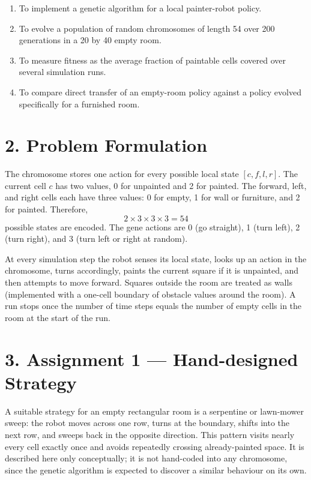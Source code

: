 \documentclass[12pt,a4paper]{article}
\begin{document}
\begin{enumerate}[leftmargin=1.6em]
  \item To implement a genetic algorithm for a local painter-robot policy.
  \item To evolve a population of random chromosomes of length 54 over 200 generations in a 20 by 40 empty room.
  \item To measure fitness as the average fraction of paintable cells covered over several simulation runs.
  \item To compare direct transfer of an empty-room policy against a policy evolved specifically for a furnished room.
\end{enumerate}

\section*{2. Problem Formulation}

The chromosome stores one action for every possible local state $[c,f,l,r]$. The current cell $c$ has two values, 0 for unpainted and 2 for painted. The forward, left, and right cells each have three values: 0 for empty, 1 for wall or furniture, and 2 for painted. Therefore,
\[
  2 \times 3 \times 3 \times 3 = 54
\]
possible states are encoded. The gene actions are 0 (go straight), 1 (turn left), 2 (turn right), and 3 (turn left or right at random).

At every simulation step the robot senses its local state, looks up an action in the chromosome, turns accordingly, paints the current square if it is unpainted, and then attempts to move forward. Squares outside the room are treated as walls (implemented with a one-cell boundary of obstacle values around the room). A run stops once the number of time steps equals the number of empty cells in the room at the start of the run.

\section*{3. Assignment 1 --- Hand-designed Strategy}

A suitable strategy for an empty rectangular room is a serpentine or lawn-mower sweep: the robot moves across one row, turns at the boundary, shifts into the next row, and sweeps back in the opposite direction. This pattern visits nearly every cell exactly once and avoids repeatedly crossing already-painted space. It is described here only conceptually; it is not hand-coded into any chromosome, since the genetic algorithm is expected to discover a similar behaviour on its own.
\end{document}
